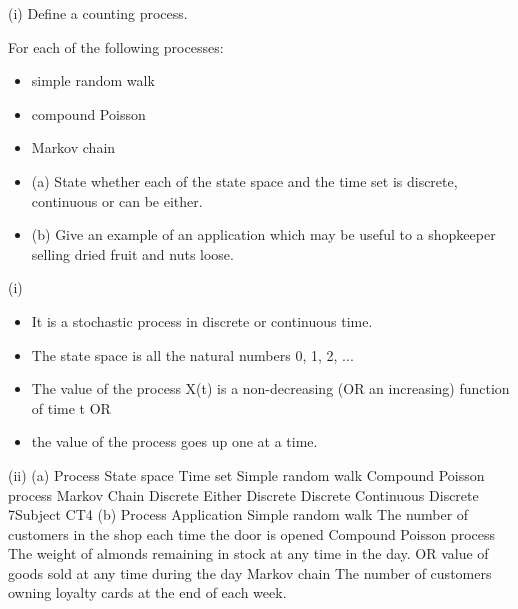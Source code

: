 \documentclass[a4paper,12pt]{article}
\begin{document}
(i) Define a counting process.

For each of the following processes:
\begin{itemize}
\item simple random walk
\item compound Poisson
\item Markov chain
\end{itemize}
\begin{itemize}
\item (a) State whether each of the state space and the time set is discrete,
continuous or can be either.
\item (b) Give an example of an application which may be useful to a
shopkeeper selling dried fruit and nuts loose.
\end{itemize}

\newpage

(i)
\begin{itemize}
\item It is a stochastic process in discrete or continuous time.
\item The state space is all the natural numbers {0, 1, 2, ... }
\item The value of the process X(t) is a non-decreasing (OR an increasing) function of
time t
OR

\item the value of the process goes up one at a time.
\end{itemize}

(ii)
(a)
Process State space Time set
Simple random walk
Compound Poisson process
Markov Chain Discrete
Either
Discrete Discrete
Continuous
Discrete
7Subject CT4 %
(b)
Process Application
Simple random walk The number of customers in the
shop each time the door is opened
Compound Poisson process The weight of almonds remaining in
stock at any time in the day.
OR
value of goods sold at any time during
the day
Markov chain
The number of customers owning
loyalty cards at the end of each week.


\end{document}
